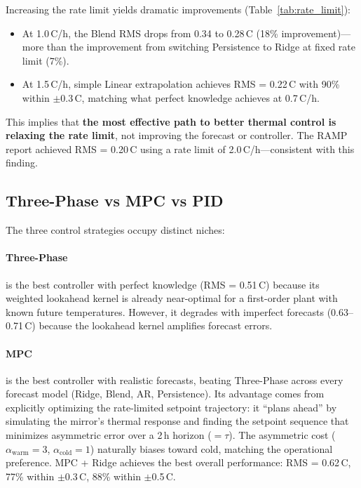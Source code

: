 \documentclass[11pt]{article}
\begin{document}
Increasing the rate limit yields dramatic improvements
(Table~\ref{tab:rate_limit}):
\begin{itemize}
  \item At 1.0\,\textdegree C/h, the Blend RMS drops from 0.34 to
    0.28\,\textdegree C (18\% improvement)---more than the improvement from
    switching Persistence to Ridge at fixed rate limit (7\%).
  \item At 1.5\,\textdegree C/h, simple Linear extrapolation achieves
    RMS = 0.22\,\textdegree C with 90\% within $\pm$0.3\,\textdegree C,
    matching what perfect knowledge achieves at 0.7\,\textdegree C/h.
\end{itemize}
This implies that \textbf{the most effective path to better thermal control
is relaxing the rate limit}, not improving the forecast or controller.  The
RAMP report achieved RMS = 0.20\,\textdegree C using a rate limit of
2.0\,\textdegree C/h---consistent with this finding.

\subsection{Three-Phase vs MPC vs PID}

The three control strategies occupy distinct niches:

\paragraph{Three-Phase} is the best controller with perfect knowledge
(RMS = 0.51\,\textdegree C) because its weighted lookahead kernel is already
near-optimal for a first-order plant with known future temperatures.
However, it degrades with imperfect forecasts
(0.63--0.71\,\textdegree C) because the lookahead kernel amplifies forecast
errors.

\paragraph{MPC} is the best controller with realistic forecasts, beating
Three-Phase across every forecast model (Ridge, Blend, AR, Persistence).
Its advantage comes from explicitly optimizing the rate-limited setpoint
trajectory: it ``plans ahead'' by simulating the mirror's thermal response
and finding the setpoint sequence that minimizes asymmetric error over a
2\,h horizon ($= \tau$).  The asymmetric cost ($\alpha_\mathrm{warm} = 3$,
$\alpha_\mathrm{cold} = 1$) naturally biases toward cold, matching the
operational preference.  MPC + Ridge achieves the best overall performance:
RMS = 0.62\,\textdegree C, 77\% within $\pm$0.3\,\textdegree C, 88\% within
$\pm$0.5\,\textdegree C.
\end{document}
